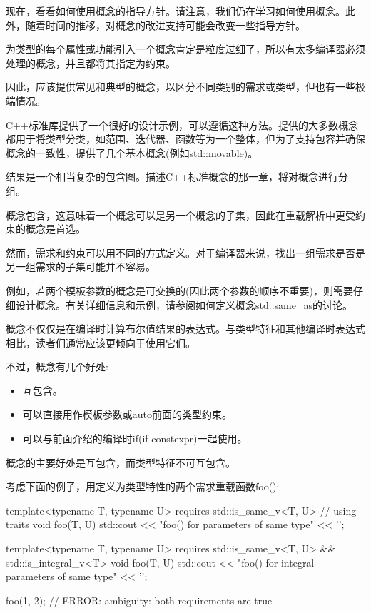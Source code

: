 
现在，看看如何使用概念的指导方针。请注意，我们仍在学习如何使用概念。此外，随着时间的推移，对概念的改进支持可能会改变一些指导方针。


为类型的每个属性或功能引入一个概念肯定是粒度过细了，所以有太多编译器必须处理的概念，并且都将其指定为约束。

因此，应该提供常见和典型的概念，以区分不同类别的需求或类型，但也有一些极端情况。

C++标准库提供了一个很好的设计示例，可以遵循这种方法。提供的大多数概念都用于将类型分类，如范围、迭代器、函数等为一个整体，但为了支持包容并确保概念的一致性，提供了几个基本概念(例如std::movable)。

结果是一个相当复杂的包含图。描述C++标准概念的那一章，将对概念进行分组。


概念包含，这意味着一个概念可以是另一个概念的子集，因此在重载解析中更受约束的概念是首选。

然而，需求和约束可以用不同的方式定义。对于编译器来说，找出一组需求是否是另一组需求的子集可能并不容易。

例如，若两个模板参数的概念是可交换的(因此两个参数的顺序不重要)，则需要仔细设计概念。有关详细信息和示例，请参阅如何定义概念std::same\_as的讨论。


概念不仅仅是在编译时计算布尔值结果的表达式。与类型特征和其他编译时表达式相比，读者们通常应该更倾向于使用它们。

不过，概念有几个好处:

\begin{itemize}
\item
互包含。

\item
可以直接用作模板参数或auto前面的类型约束。

\item
可以与前面介绍的编译时if(if constexpr)一起使用。
\end{itemize}


概念的主要好处是互包含，而类型特征不可互包含。

考虑下面的例子，用定义为类型特性的两个需求重载函数foo():

\begin{cpp}
template<typename T, typename U>
requires std::is_same_v<T, U> // using traits
void foo(T, U)
{
	std::cout << "foo() for parameters of same type" << '\n';
}

template<typename T, typename U>
requires std::is_same_v<T, U> && std::is_integral_v<T>
void foo(T, U)
{
	std::cout << "foo() for integral parameters of same type" << '\n';
}

foo(1, 2); // ERROR: ambiguity: both requirements are true
\end{cpp}

